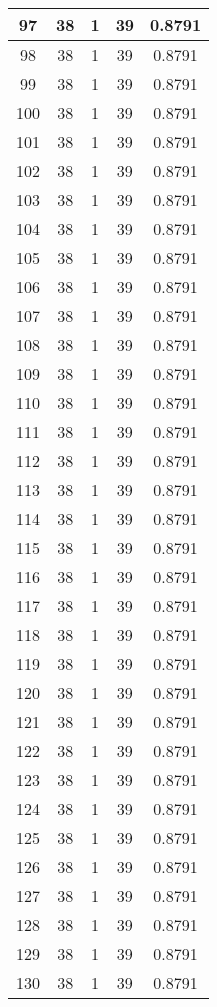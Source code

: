 \documentclass[letterpaper, 12pt]{article}
\begin{document}
\begin{longtable}{|c|c|c|c|c|}
\hline
97 & 38 & 1 & 39 & 0.8791 \\
\hline
98 & 38 & 1 & 39 & 0.8791 \\
\hline
99 & 38 & 1 & 39 & 0.8791 \\
\hline
100 & 38 & 1 & 39 & 0.8791 \\
\hline
101 & 38 & 1 & 39 & 0.8791 \\
\hline
102 & 38 & 1 & 39 & 0.8791 \\
\hline
103 & 38 & 1 & 39 & 0.8791 \\
\hline
104 & 38 & 1 & 39 & 0.8791 \\
\hline
105 & 38 & 1 & 39 & 0.8791 \\
\hline
106 & 38 & 1 & 39 & 0.8791 \\
\hline
107 & 38 & 1 & 39 & 0.8791 \\
\hline
108 & 38 & 1 & 39 & 0.8791 \\
\hline
109 & 38 & 1 & 39 & 0.8791 \\
\hline
110 & 38 & 1 & 39 & 0.8791 \\
\hline
111 & 38 & 1 & 39 & 0.8791 \\
\hline
112 & 38 & 1 & 39 & 0.8791 \\
\hline
113 & 38 & 1 & 39 & 0.8791 \\
\hline
114 & 38 & 1 & 39 & 0.8791 \\
\hline
115 & 38 & 1 & 39 & 0.8791 \\
\hline
116 & 38 & 1 & 39 & 0.8791 \\
\hline
117 & 38 & 1 & 39 & 0.8791 \\
\hline
118 & 38 & 1 & 39 & 0.8791 \\
\hline
119 & 38 & 1 & 39 & 0.8791 \\
\hline
120 & 38 & 1 & 39 & 0.8791 \\
\hline
121 & 38 & 1 & 39 & 0.8791 \\
\hline
122 & 38 & 1 & 39 & 0.8791 \\
\hline
123 & 38 & 1 & 39 & 0.8791 \\
\hline
124 & 38 & 1 & 39 & 0.8791 \\
\hline
125 & 38 & 1 & 39 & 0.8791 \\
\hline
126 & 38 & 1 & 39 & 0.8791 \\
\hline
127 & 38 & 1 & 39 & 0.8791 \\
\hline
128 & 38 & 1 & 39 & 0.8791 \\
\hline
129 & 38 & 1 & 39 & 0.8791 \\
\hline
130 & 38 & 1 & 39 & 0.8791 \\

\end{longtable}
\end{document}
